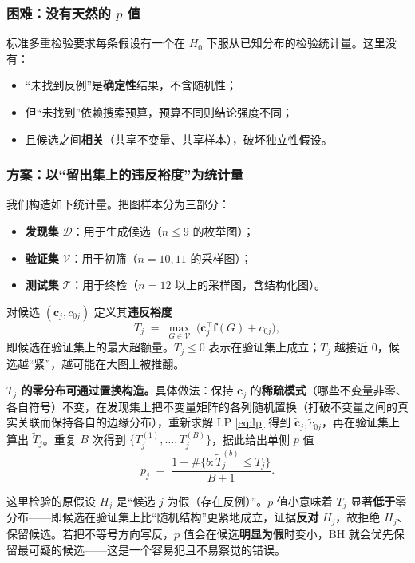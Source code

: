 \subsubsection{困难：没有天然的 $p$ 值}

标准多重检验要求每条假设有一个在 $H_0$ 下服从已知分布的检验统计量。这里没有：
\begin{itemize}
  \item “未找到反例”是\textbf{确定性}结果，不含随机性；
  \item 但“未找到”依赖搜索预算，预算不同则结论强度不同；
  \item 且候选之间\textbf{相关}（共享不变量、共享样本），破坏独立性假设。
\end{itemize}

\subsubsection{方案：以“留出集上的违反裕度”为统计量}

我们构造如下统计量。把图样本分为三部分：
\begin{itemize}
  \item \textbf{发现集} $\mathcal{D}$：用于生成候选（$n\le 9$ 的枚举图）；
  \item \textbf{验证集} $\mathcal{V}$：用于初筛（$n=10,11$ 的采样图）；
  \item \textbf{测试集} $\mathcal{T}$：用于终检（$n=12$ 以上的采样图，含结构化图）。
\end{itemize}

对候选 $(\bm{c}_j,c_{0j})$ 定义其\textbf{违反裕度}
\begin{equation}
  T_j \;=\; \max_{G\in\mathcal{V}}\; \bigl(\bm{c}_j^{\top}\bm{f}(G)+c_{0j}\bigr),
  \label{eq:margin}
\end{equation}
即候选在验证集上的最大超额量。$T_j\le 0$ 表示在验证集上成立；$T_j$ 越接近 $0$，候选越“紧”，越可能在大图上被推翻。

\textbf{$T_j$ 的零分布可通过置换构造。}具体做法：保持 $\bm{c}_j$ 的\textbf{稀疏模式}（哪些不变量非零、各自符号）不变，在发现集上把不变量矩阵的各列随机置换（打破不变量之间的真实关联而保持各自的边缘分布），重新求解 LP \eqref{eq:lp} 得到 $\tilde{\bm{c}}_j,\tilde{c}_{0j}$，再在验证集上算出 $\tilde{T}_j$。重复 $B$ 次得到 $\{T_j^{(1)},\dots,T_j^{(B)}\}$，据此给出单侧 $p$ 值
\begin{equation}
  p_j \;=\; \frac{1+\#\{b: \tilde{T}_j^{(b)} \le T_j\}}{B+1}.
  \label{eq:pval}
\end{equation}

\begin{remark}[$p$ 值的方向]
\label{rem:pdir}
这里检验的原假设 $H_j$ 是“候选 $j$ 为假（存在反例）”。$p$ 值小意味着 $T_j$ 显著\textbf{低于}零分布——即候选在验证集上比“随机结构”更紧地成立，证据\textbf{反对} $H_j$，故拒绝 $H_j$、保留候选。若把不等号方向写反，$p$ 值会在候选\textbf{明显为假}时变小，BH 就会优先保留最可疑的候选——这是一个容易犯且不易察觉的错误。
\end{remark}

